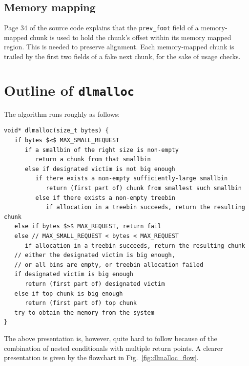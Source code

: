 \documentclass[12pt,a4paper]{article}
\theoremstyle{remark}
\begin{document}
\subsection{Memory mapping}\label{sect:memory_mapping}
Page 34 of the source code explains that the {\tt prev\_foot} field of a memory-mapped chunk is used to hold the chunk's offset within its memory mapped region. This is needed to preserve alignment. Each memory-mapped chunk is trailed by the first two fields of a fake next chunk, for the sake of usage checks.

\section{Outline of {\tt dlmalloc}}

The algorithm runs roughly as follows:

\begin{lstlisting}
void* dlmalloc(size_t bytes) {
   if bytes $≤$ MAX_SMALL_REQUEST
      if a smallbin of the right size is non-empty
         return a chunk from that smallbin
      else if designated victim is not big enough
         if there exists a non-empty sufficiently-large smallbin
            return (first part of) chunk from smallest such smallbin
         else if there exists a non-empty treebin
            if allocation in a treebin succeeds, return the resulting chunk
   else if bytes $≥$ MAX_REQUEST, return fail 
   else // MAX_SMALL_REQUEST < bytes < MAX_REQUEST
      if allocation in a treebin succeeds, return the resulting chunk
   // either the designated victim is big enough,
   // or all bins are empty, or treebin allocation failed
   if designated victim is big enough
      return (first part of) designated victim
   else if top chunk is big enough
      return (first part of) top chunk
   try to obtain the memory from the system
}
\end{lstlisting}

The above presentation is, however, quite hard to follow because of the combination of nested conditionals with multiple return points. A clearer presentation is given by the flowchart in Fig.~\ref{fig:dlmalloc_flow}.
\end{document}
